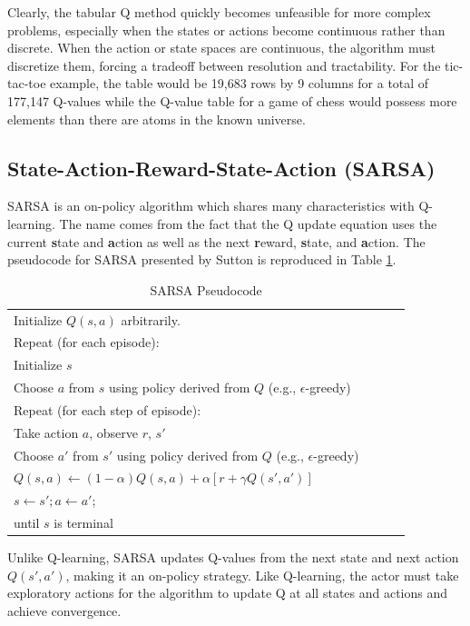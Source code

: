 Clearly, the tabular Q method quickly becomes unfeasible for more complex problems, especially when the states or actions become continuous rather than discrete. When the action or state spaces are continuous, the algorithm must discretize them, forcing a tradeoff between resolution and tractability. For the tic-tac-toe example, the table would be 19,683 rows by 9 columns for a total of 177,147 Q-values while the Q-value table for a game of chess would possess more elements than there are atoms in the known universe.

\subsection{State-Action-Reward-State-Action (SARSA)}
SARSA is an on-policy algorithm which shares many characteristics with Q-learning. The name comes from the fact that the Q update equation uses the current \textbf{s}tate and \textbf{a}ction as well as the next \textbf{r}eward, \textbf{s}tate, and \textbf{a}ction. The pseudocode for SARSA presented by Sutton is reproduced in Table \ref{tab:sarsa}.
\begin{table}[h]
	\caption{SARSA Pseudocode}  \label{tab:sarsa}
	\begin{tabular}{|p{0.9\linewidth}|}\hline %
		Initialize $Q(s,a)$ arbitrarily. \\
		Repeat (for each episode): \\
		\qquad Initialize $s$\\
		\qquad Choose $a$ from $s$ using policy derived from $Q$ (e.g., $\epsilon$-greedy)\\
		\qquad Repeat (for each step of episode):\\
		\qquad \qquad Take action $a$, observe $r$, $s'$\\
		\qquad \qquad Choose $a'$ from $s'$ using policy derived from $Q$ (e.g., $\epsilon$-greedy)\\
		\qquad \qquad $	Q(s,a)\gets (1-\alpha)Q(s,a) + \alpha [r + \gamma Q(s',a')]$\\
		\qquad \qquad $s \gets s'; a \gets a'$;\\
		\qquad until $s$ is terminal \\
		\hline
	\end{tabular}
\end{table}

Unlike Q-learning, SARSA updates Q-values from the next state and next action $Q(s',a')$, making it an on-policy strategy. Like Q-learning, the actor must take exploratory actions for the algorithm to update Q at all states and actions and achieve convergence.

